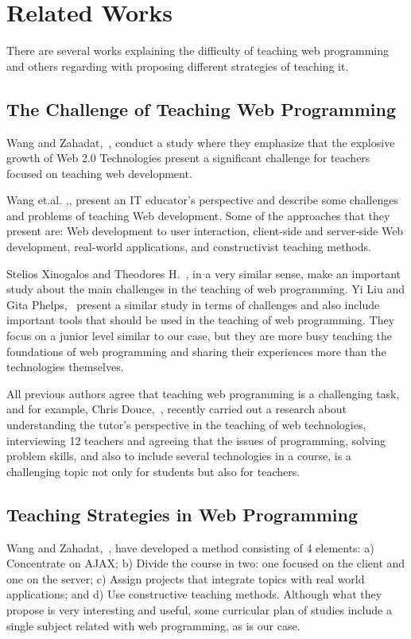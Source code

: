 \section{Related Works}
There are several works explaining the difficulty of teaching web programming and others
regarding with proposing different strategies of teaching it.

\subsection{The Challenge of Teaching Web Programming}
Wang and Zahadat,~\cite{9Wang2009}, conduct a study where they emphasize that the explosive growth 
of Web 2.0 Technologies present a significant challenge for teachers focused on teaching web development. 

Wang et.al. ,\cite{wang2009teaching}, present an IT educator's perspective and
describe some challenges and problems of teaching Web development. Some of the approaches that they
present are: Web development to user interaction, client-side and server-side Web development, 
real-world applications, and constructivist teaching methods.

Stelios Xinogalos and Theodores H.~\cite{7XinogalosK2012}, in a very similar sense, make an  important study about the main challenges in the teaching of web programming. 
Yi Liu and Gita Phelps,~\cite{4Liu2011} present a similar study in terms of challenges and also 
include important tools that should be used in the teaching of web programming. 
They focus on a junior level similar to our case, but they are more busy teaching the 
foundations of web programming and sharing their experiences more than the technologies 
themselves.

All previous authors agree that teaching web programming is a challenging task, and for example, 
Chris Douce,~\cite{Douce2018}, recently carried out a research about understanding the tutor's 
perspective in the teaching of web technologies, interviewing 12 teachers and agreeing that the 
issues of programming, solving problem skills, and also to include several technologies in a course, 
is a challenging topic not only for students but also for teachers.

\subsection{Teaching Strategies in Web Programming}
Wang and Zahadat,~\cite{9Wang2009}, have developed a method consisting of 4 elements: 
a) Concentrate on AJAX; 
b) Divide the course in two: one focused on the client and one on the server; 
c) Assign projects that integrate topics with real world applications; and 
d) Use constructive teaching methods. 
Although what they propose is very interesting and useful, some curricular plan of studies
include a single subject related with web programming, as is our case. 

